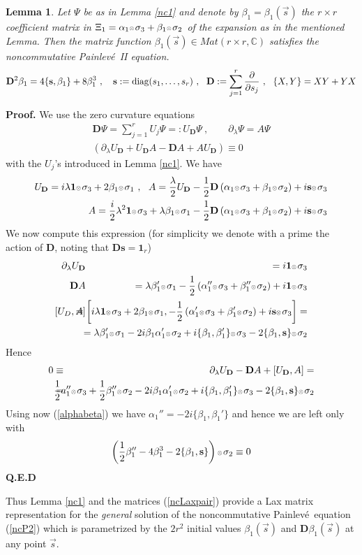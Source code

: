 \documentclass{article}
\def\ss{\mathbf s}
\newtheorem{lemma}{Lemma}[section]
\def\ot{\hbox{\resizebox{6pt}{!}{$ \otimes \,
$}}}
\def \C{{\mathbf C}}
\def \D{{\mathbf D}}
\def\b{\beta}
\def\s{\sigma}
\def\C{{\mathbb C}}
\def\&{&\hspace{-20pt}}
\def\1{\mathbf 1}
\def\a{{\alpha}}
\def \pa{\partial}
\def\QED{ {\bf Q.E.D}\par \vskip 4pt}
\newcommand{\be}{\begin{eqnarray}}
\newcommand{\ee}{\end{eqnarray}}
\def\le{\left}
\def\ri{\right}
\begin{document}
\begin{lemma}
\label{lemmancP2}
Let $\Psi$ be as in Lemma \ref{nc1} and denote by $\beta_1=\beta_1(\vec s)$ the $r\times r$ coefficient matrix in $\Xi_1 = \a_1\ot \s_3 + \b_1 \ot \s_2$ of the expansion as in the mentioned Lemma.
Then the matrix function $\b_1(\vec s)\in Mat(r\times r,\C)$ satisfies the noncommutative Painlev\'e\ II equation.
\be
\D^2 \b_1 = 4\{\ss, \b_1\}  + 8 \b_1^3\ ,\label{1_ncP2}\  \ \ 
\ss:= {\rm diag}(s_1,\dots, s_r)\ , \ \ \D:=\sum_{j=1}^r \frac {\pa}{\pa s_j}\ ,\ \ \{X, Y\}= XY+YX
\ee
\end{lemma}
{\bf Proof.}
We use the zero curvature equations
\be
\D \Psi = \sum_{j=1}^rU_j  \Psi =: U_\D \Psi\ ,\qquad
\pa_\lambda \Psi = A \Psi
\label{ncLaxpair}
\\
(\pa_\lambda  U_\D  + U_\D A - \D A + AU_\D) \equiv 0
\ee
with the $U_j$'s introduced in Lemma \ref{nc1}.
We have 
\be
U_\D =i  \lambda \1 \ot \s_3 + 2 \b_1 \ot\s_1\ ,\ \ A = \frac \lambda 2 U_\D - \frac 1 2 \D\le(\a_1\ot \s_3 + \b_1\ot \s_2\ri) + i\ss\ot \s_3\\
A=
\frac i2  \lambda^2 \1 \ot \s_3 + \lambda \b_1\ot \s_1 - \frac 1 2 \D\le(\a_1\ot \s_3 + \b_1\ot \s_2\ri) + i\ss\ot\s_3
\ee
We now compute this expression (for simplicity we denote with a prime the action of $\D$, noting that $\D\ss = \1_r$)
\be
\pa_\lambda  U_\D &\&= i\1\ot \s_3\\
\D A &\&= \lambda    \b_1'\ot  \s_1 -\frac 1 2  \le(\a_1'' \ot \s_3 + \b_1'' \ot \s_2\ri) +i  \1 \ot \s_3\\[1pt]
[U_D,A] &\&= 
\le[
i  \lambda \1 \ot \s_3 + 2 \b_1 \ot\s_1,
- \frac 1 2 \le(\a_1'\ot \s_3 + \b_1'\ot \s_2\ri) + i\ss\ot\s_3
\ri]=
\\
&\&=
  \lambda  \b_1' \ot \s_1 - 2i \b_1\a_1' \ot \s_2  +i \{\b_1 ,\b_1'\} \ot\s_3   - 2  \{\b_1,\ss\}\ot \s_2   
\ee
Hence 
\be
0\equiv&\& \pa_\lambda  U_\D - \D A + [U_\D,A]=\\
=&\&
\frac 1 2 a_1'' \ot \s_3 + \frac 1 2 \b_1'' \ot \s_2- 2i \b_1\a_1' \ot \s_2  +i \{\b_1 ,\b_1'\} \ot\s_3   - 2  \{\b_1,\ss\}\ot \s_2
   \ee
   Using now (\ref{alphabeta}) we have $\a_1'' =-2i \{\b_1,\b_1'\}$ and hence we are left only with 
   \be
  \le( \frac 1 2 \b_1'' -4 \b_1^3      - 2  \{\b_1,\ss\}\ri)\ot \s_2\equiv 0
   \ee
\QED





Thus Lemma \ref{nc1} and the matrices (\ref{ncLaxpair}) provide a Lax matrix representation for the {\em general} solution of the noncommutative Painlev\'e\ equation (\ref{ncP2}) which is parametrized by the $2r^2$ initial values $\b_1(\vec s)$ and $\D \b_1(\vec s)$ at any point $\vec s$. 
\end{document}
